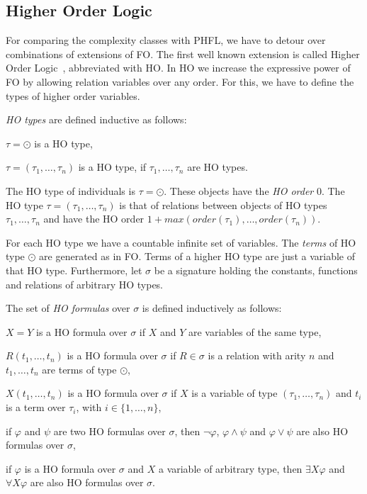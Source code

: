 

\subsection{Higher Order Logic}\label{subsec:higherOrderLogic}

For comparing the complexity classes with PHFL, we have to detour over combinations of extensions of FO. The first well
known extension is called Higher Order Logic~\cite{vanBenthem2001higher}, abbreviated with HO. In HO we
increase the expressive power of FO by allowing relation variables over any order. For this, we have to define the
types of higher order variables.

\begin{definition}
    \emph{HO types} are defined inductive as follows:
    \begin{compactitem}
        \item $\tau = \odot$ is a HO type,
        \item $\tau = (\tau_1, \dots, \tau_n)$ is a HO type, if $\tau_1, \dots, \tau_n$ are
        HO types.
    \end{compactitem}
\end{definition}

The HO type of individuals is $\tau = \odot$. These objects have the \textit{HO order} $0$. The HO type $\tau = (\tau_1,
\dots, \tau_n)$ is that of relations between objects of HO types $\tau_1, \dots, \tau_n$ and have the HO order $1 + max
(order(\tau_1), \dots, order(\tau_n))$.

For each HO type we have a countable infinite set of variables. The \textit{terms} of HO type $\odot$ are
generated as in FO. Terms of a higher HO type are just a variable of that HO type. Furthermore, let $\sigma$ be
a signature holding the constants, functions and relations of arbitrary HO types.

\begin{definition}
    The set of \emph{HO formulas} over $\sigma$ is defined inductively as follows:
    \begin{compactitem}
        \item $X = Y$ is a HO formula over $\sigma$ if $X$ and $Y$ are variables of the same type,
        \item $R(t_1, \dots, t_n)$ is a HO formula over $\sigma$ if $R \in \sigma$ is a relation with arity $n$ and
        $t_1, \dots, t_n$ are terms of type $\odot$,
        \item $X(t_1, \dots, t_n)$ is a HO formula over $\sigma$ if $X$ is a variable of type $(\tau_1, \dots, \tau_n)$
        and $t_i$ is a term over $\tau_i$, with $i \in \{1, \dots, n\}$,
        \item if $\varphi$ and $\psi$ are two HO formulas over $\sigma$, then $\neg\varphi$, $\varphi\wedge\psi$ and $\varphi
        \vee \psi$ are also HO formulas over $\sigma$,
        \item if $\varphi$ is a HO formula over $\sigma$ and $X$ a variable of arbitrary type, then $\exists X\varphi$ and
        $\forall X\varphi$ are also HO formulas over $\sigma$.
    \end{compactitem}
\end{definition}

